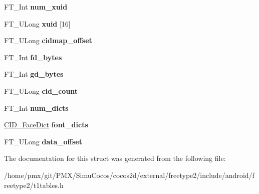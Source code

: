 \begin{DoxyCompactItemize}
F\+T\+\_\+\+Int {\bfseries num\+\_\+xuid}
\item 
\mbox{\label{structCID__FaceInfoRec___a2fa7189d45628f15dd726cb06024fe90}} 
F\+T\+\_\+\+U\+Long {\bfseries xuid} \mbox{[}16\mbox{]}
\item 
\mbox{\label{structCID__FaceInfoRec___a8c72c1a90704c7e3519ca182613fec5a}} 
F\+T\+\_\+\+U\+Long {\bfseries cidmap\+\_\+offset}
\item 
\mbox{\label{structCID__FaceInfoRec___a72944c0b4e85dba619adaf114ff7a8b1}} 
F\+T\+\_\+\+Int {\bfseries fd\+\_\+bytes}
\item 
\mbox{\label{structCID__FaceInfoRec___a4f1caffd756d0daebbc69af0dcdd74a0}} 
F\+T\+\_\+\+Int {\bfseries gd\+\_\+bytes}
\item 
\mbox{\label{structCID__FaceInfoRec___a5eae3fdfaded7bdef4e0bd027ecba595}} 
F\+T\+\_\+\+U\+Long {\bfseries cid\+\_\+count}
\item 
\mbox{\label{structCID__FaceInfoRec___a3b53b4e162a3c1434c6b91334aa69041}} 
F\+T\+\_\+\+Int {\bfseries num\+\_\+dicts}
\item 
\mbox{\label{structCID__FaceInfoRec___a821a773b846c837338d1c03984e5e7d5}} 
\hyperlink{structCID__FaceDictRec__}{C\+I\+D\+\_\+\+Face\+Dict} {\bfseries font\+\_\+dicts}
\item 
\mbox{\label{structCID__FaceInfoRec___a31e8fb9ac2b0c1fa63220e5e07aeea97}} 
F\+T\+\_\+\+U\+Long {\bfseries data\+\_\+offset}
\end{DoxyCompactItemize}


The documentation for this struct was generated from the following file\+:\begin{DoxyCompactItemize}
\item 
/home/pmx/git/\+P\+M\+X/\+Simu\+Cocos/cocos2d/external/freetype2/include/android/freetype2/t1tables.\+h\end{DoxyCompactItemize}
